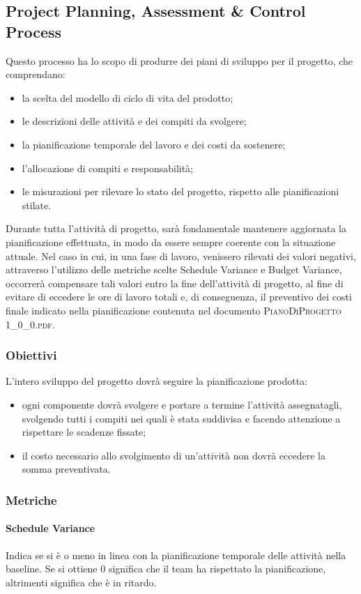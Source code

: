 	\subsection{Project Planning, Assessment \& Control Process}
	Questo processo ha lo scopo di produrre dei piani di sviluppo per il progetto, che comprendano:
	\begin{itemize}
		\item la scelta del modello di ciclo di vita del prodotto;
		\item le descrizioni delle attività e dei compiti da svolgere;
		\item la pianificazione temporale del lavoro e dei costi da sostenere;
		\item l'allocazione di compiti e responsabilità;
		\item le misurazioni per rilevare lo stato del progetto, rispetto alle pianificazioni stilate.
	\end{itemize}
	Durante tutta l’attività di	progetto, sarà fondamentale mantenere aggiornata la pianificazione effettuata, in modo da essere sempre coerente con la situazione attuale. Nel caso in cui, in una fase di lavoro, venissero rilevati dei valori negativi, attraverso l'utilizzo delle metriche scelte Schedule Variance e Budget Variance, occorrerà compensare tali valori entro la fine dell’attività di progetto, al fine di evitare di eccedere le ore di lavoro totali e, di conseguenza, il preventivo dei costi finale indicato nella pianificazione contenuta nel documento \textsc{PianoDiProgetto 1\_0\_0.pdf}.
		\subsubsection{Obiettivi}
		L’intero sviluppo del progetto dovrà seguire la pianificazione prodotta:
		\begin{itemize}
			\item ogni componente dovrà svolgere e portare a termine l'attività assegnatagli, svolgendo tutti i compiti nei quali è stata suddivisa e facendo attenzione a rispettare le scadenze fissate;
			\item il costo necessario allo svolgimento di un'attività non dovrà eccedere la somma
			preventivata.
		\end{itemize}
		\subsubsection{Metriche}
			\paragraph{Schedule Variance}
			Indica se si è o meno in linea con la pianificazione temporale delle attività nella baseline.
			Se si ottiene 0 significa che il team ha rispettato la pianificazione, altrimenti significa che è in ritardo.
			
